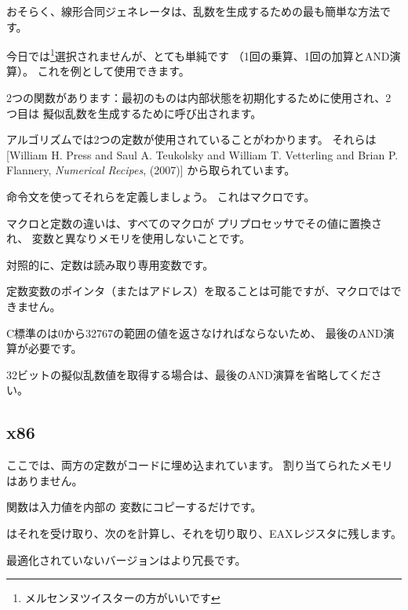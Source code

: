 ﻿
\label{LCG_simple}

おそらく、線形合同ジェネレータは、乱数を生成するための最も簡単な方法です。

今日では\footnote{メルセンヌツイスターの方がいいです}選択されませんが、とても単純です
（1回の乗算、1回の加算とAND演算）。
これを例として使用できます。



2つの関数があります：最初のものは内部状態を初期化するために使用され、2つ目は
擬似乱数を生成するために呼び出されます。

アルゴリズムでは2つの定数が使用されていることがわかります。 
それらは[William H. Press and Saul A. Teukolsky and William T. Vetterling and Brian P. Flannery, \emph{Numerical Recipes}, (2007)]
から取られています。

 \CCpp 命令文を使ってそれらを定義しましょう。 これはマクロです。

\CCpp マクロと定数の違いは、すべてのマクロが \CCpp プリプロセッサでその値に置換され、
変数と異なりメモリを使用しないことです。

対照的に、定数は読み取り専用変数です。

定数変数のポインタ（またはアドレス）を取ることは可能ですが、マクロではできません。

C標準のは0から32767の範囲の値を返さなければならないため、
最後のAND演算が必要です。

32ビットの擬似乱数値を取得する場合は、最後のAND演算を省略してください。

\subsection{x86}



ここでは、両方の定数がコードに埋め込まれています。 
割り当てられたメモリはありません。

関数は入力値を内部の
変数にコピーするだけです。

はそれを受け取り、次のを計算し、それを切り取り、EAXレジスタに残します。

最適化されていないバージョンはより冗長です。



